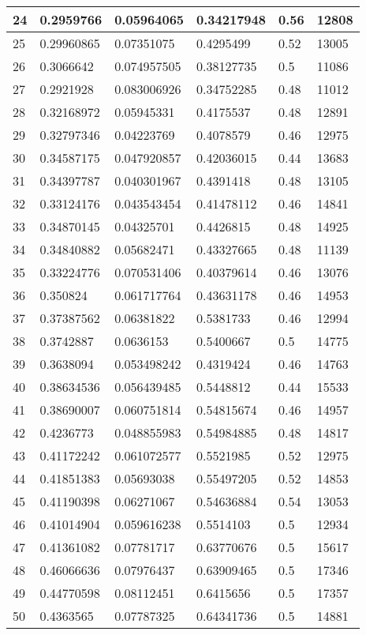 \begin{longtable}{|l|l|l|l|l|l|}
24 & 0.2959766 & 0.05964065 & 0.34217948 & 0.56 & 12808 \\ \hline 
25 & 0.29960865 & 0.07351075 & 0.4295499 & 0.52 & 13005 \\ \hline 
26 & 0.3066642 & 0.074957505 & 0.38127735 & 0.5 & 11086 \\ \hline 
27 & 0.2921928 & 0.083006926 & 0.34752285 & 0.48 & 11012 \\ \hline 
28 & 0.32168972 & 0.05945331 & 0.4175537 & 0.48 & 12891 \\ \hline 
29 & 0.32797346 & 0.04223769 & 0.4078579 & 0.46 & 12975 \\ \hline 
30 & 0.34587175 & 0.047920857 & 0.42036015 & 0.44 & 13683 \\ \hline 
31 & 0.34397787 & 0.040301967 & 0.4391418 & 0.48 & 13105 \\ \hline 
32 & 0.33124176 & 0.043543454 & 0.41478112 & 0.46 & 14841 \\ \hline 
33 & 0.34870145 & 0.04325701 & 0.4426815 & 0.48 & 14925 \\ \hline 
34 & 0.34840882 & 0.05682471 & 0.43327665 & 0.48 & 11139 \\ \hline 
35 & 0.33224776 & 0.070531406 & 0.40379614 & 0.46 & 13076 \\ \hline 
36 & 0.350824 & 0.061717764 & 0.43631178 & 0.46 & 14953 \\ \hline 
37 & 0.37387562 & 0.06381822 & 0.5381733 & 0.46 & 12994 \\ \hline 
38 & 0.3742887 & 0.0636153 & 0.5400667 & 0.5 & 14775 \\ \hline 
39 & 0.3638094 & 0.053498242 & 0.4319424 & 0.46 & 14763 \\ \hline 
40 & 0.38634536 & 0.056439485 & 0.5448812 & 0.44 & 15533 \\ \hline 
41 & 0.38690007 & 0.060751814 & 0.54815674 & 0.46 & 14957 \\ \hline 
42 & 0.4236773 & 0.048855983 & 0.54984885 & 0.48 & 14817 \\ \hline 
43 & 0.41172242 & 0.061072577 & 0.5521985 & 0.52 & 12975 \\ \hline 
44 & 0.41851383 & 0.05693038 & 0.55497205 & 0.52 & 14853 \\ \hline 
45 & 0.41190398 & 0.06271067 & 0.54636884 & 0.54 & 13053 \\ \hline 
46 & 0.41014904 & 0.059616238 & 0.5514103 & 0.5 & 12934 \\ \hline 
47 & 0.41361082 & 0.07781717 & 0.63770676 & 0.5 & 15617 \\ \hline 
48 & 0.46066636 & 0.07976437 & 0.63909465 & 0.5 & 17346 \\ \hline 
49 & 0.44770598 & 0.08112451 & 0.6415656 & 0.5 & 17357 \\ \hline 
50 & 0.4363565 & 0.07787325 & 0.64341736 & 0.5 & 14881 \\ \hline 
\end{longtable}